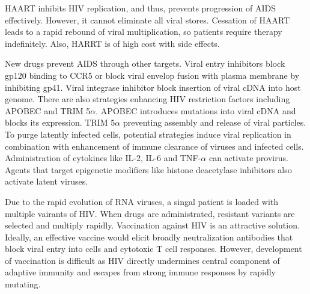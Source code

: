 \documentclass[11pt]{article}
\begin{document}
\begin{sloppypar}
\par

HAART inhibits HIV replication, and thus, prevents progression of AIDS effectively. 
However, it cannot eliminate all viral stores. 
Cessation of HAART leads to a rapid rebound of viral multiplication, so patients require therapy indefinitely. 
Also, HARRT is of high cost with side effects. 

\par

New drugs prevent AIDS through other targets. 
Viral entry inhibitors block gp120 binding to CCR5 or block viral envelop fusion with plasma membrane by inhibiting gp41. 
Viral integrase inhibitor block insertion of viral cDNA into host genome. 
There are also strategies enhancing HIV restriction factors including APOBEC and TRIM 5$\alpha$. 
APOBEC introduces mutations into viral cDNA and blocks its expression. 
TRIM 5$\alpha$ preventing assembly and release of viral particles. 
To purge latently infected cells, potential strategies induce viral replication in combination with enhancement of immune clearance of viruses and infected cells. 
Administration of cytokines like IL-2, IL-6 and TNF-$\alpha$ can activate provirus. 
Agents that target epigenetic modifiers like histone deacetylase inhibitors also activate latent viruses. 

\par

Due to the rapid evolution of RNA viruses, a singal patient is loaded with multiple vairants of HIV. 
When drugs are administrated, resistant variants are selected and multiply rapidly. 
Vaccination against HIV is an attractive solution. 
Ideally, an effective vaccine would elicit broadly neutralization antibodies that block viral entry into cells and cytotoxic T cell responses. 
However, development of vaccination is difficult as HIV directly undermines central component of adaptive immunity and escapes from strong immune responses by rapidly mutating. 

\end{sloppypar}
\end{document}
